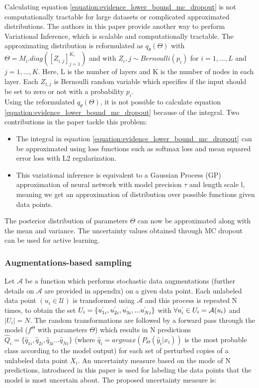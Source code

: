 Calculating equation \ref{equation:evidence_lower_bound_mc_dropout} is not computationally tractable for large datasets or complicated approximated distributions. The authors in this paper provide another way to perform Variational Inference, which is scalable and computationally tractable. The approximating distribution is reformulated as $q_{\theta}(\Theta)$ with $\Theta = M_i . diag([Z_{i, j}]_{j=1}^{K_i})$ and with $Z_i,j \sim Bernoulli(p_i)$ for $i = 1, ...,L$ and $j = 1, ...,K$. Here, L is the number of layers and K is the number of nodes in each layer. Each $Z_{i,j}$ is Bernoulli random variable which specifies if the input should be set to zero or not with a probability $p_i$. \\
Using the reformulated $q_{\theta}(\Theta)$, it is not possible to calculate equation \ref{equation:evidence_lower_bound_mc_dropout} because of the integral. Two contributions in the paper tackle this problem:
\begin{itemize}
  \setlength\itemsep{0em}
  \item The integral in equation \ref{equation:evidence_lower_bound_mc_dropout} can be approximated using loss functions such as softmax loss and mean squared error loss with L2 regularization.
  \item This variational inference is equivalent to a Gaussian Process (GP) approximation of neural network with model precision $\tau$ and length scale l, meaning we get an approximation of distribution over possible functions given data points.
\end{itemize}
The posterior distribution of parameters $\Theta$ can now be approximated along with the mean and variance. The uncertainty values obtained through MC dropout can be used for active learning.

\subsubsection{Augmentations-based sampling\cite{sadafi2019}}
Let $\mathcal{A}$ be a function which performs stochastic data augmentations (further details on $\mathcal{A}$ are provided in appendix) on a given data point. Each unlabeled data point $(u_i\in\mathcal{U})$ is transformed using $\mathcal{A}$ and this process is repeated N times, to obtain the set $U_i = \{u_{1i}^{`}, u_{2i}^{`}, u^{`}_{3i}, ... u_{Ni}^{`}\}$ with $\forall u_i^{`} \in U_i = \mathcal{A}(u_i)$ and $|U_i| = N$. The random transformations are followed by a forward pass through the model ($f^\Theta$ with parameters $\Theta$) which results in N predictions $\hat{Q}_i = \{\hat{q}_{1i}, \hat{q}_{2i}, \hat{q}_{3i} ... \hat{q}_{Ni}\}$ (where $\hat{q}_i = argmax(P_\Theta(\hat{y}_i|x_i))$ is the most probable class according to the model output) for each set of perturbed copies of a unlabeled data point $X_i$. An uncertainty measure based on the mode of N predictions, introduced in this paper\cite{sadafi2019} is used for labeling the data points that the model is most uncertain about. The proposed uncertainty measure is:

